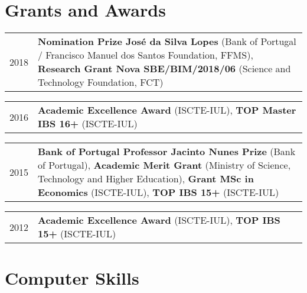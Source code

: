 \documentclass[a4paper,11pt]{article} %
\begin{document}
\section[Grants and Awards]{\faEuro \hspace{3pt} Grants and Awards}

\begin{tabular}{r|p{15cm}}
	2018 & \textbf{Nomination Prize José da Silva Lopes} (Bank of Portugal / Francisco Manuel dos Santos Foundation, FFMS), \textbf{Research Grant Nova SBE/BIM/2018/06} (Science and Technology Foundation, FCT) \\
\end{tabular}

\begin{tabular}{r|p{15cm}}
	2016 & \textbf{Academic Excellence Award} (ISCTE-IUL), \textbf{TOP Master IBS 16+} (ISCTE-IUL) \\
\end{tabular}

\begin{tabular}{r|p{15cm}}	
	2015 & \textbf{Bank of Portugal Professor Jacinto Nunes Prize} (Bank of Portugal), \textbf{Academic Merit Grant} (Ministry of Science, Technology and Higher Education), \textbf{Grant MSc in Economics} (ISCTE-IUL), \textbf{TOP IBS 15+} (ISCTE-IUL) \\
\end{tabular}

\begin{tabular}{r|p{15cm}}		
	2012 & \textbf{Academic Excellence Award} (ISCTE-IUL), \textbf{TOP IBS 15+} 	(ISCTE-IUL) \\
\end{tabular}		
%	



\section[Computer Skills]{\faKeyboardO \hspace{3pt} Computer Skills}
\end{document}
